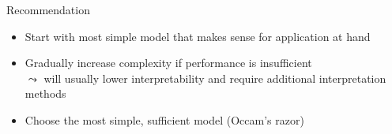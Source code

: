 \documentclass[11pt,compress,t,notes=noshow, aspectratio=169, xcolor=table]{beamer}
\begin{document}
\begin{frame}{Recommendation}
    \begin{itemize}
        \item Start with most simple model that makes sense for application at hand
        \item Gradually increase complexity if performance is insufficient\\
        $\leadsto$ will usually lower interpretability and require additional interpretation methods
        \item Choose the most simple, sufficient model (Occam's razor)
    \end{itemize} 

    \bigskip



\end{frame}
\end{document}

